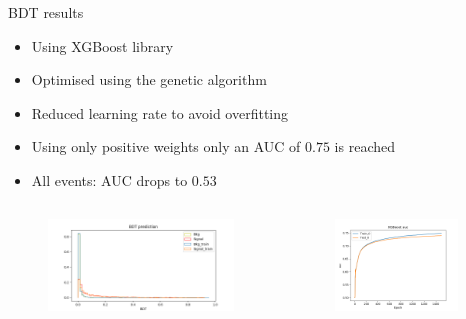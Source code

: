 \begin{frame}{BDT results}
    \begin{itemize}
        \item Using XGBoost library
        \item Optimised using the genetic algorithm
        \item Reduced learning rate to avoid overfitting
        \item Using {\large only} positive weights only an AUC of $0.75$ is reached
        \item All events: AUC drops to $0.53$
    \end{itemize}
    \begin{columns}
        \begin{column}{0.5\textwidth}
            \begin{figure}
                \includegraphics[width=\textwidth]{pablo_response.png}
            \end{figure}           
        \end{column}
        \begin{column}{0.5\textwidth}
            \begin{figure}
                \includegraphics[width=0.9\textwidth]{pablo_AUC.png}
            \end{figure}            
        \end{column}
    \end{columns}

\end{frame}

